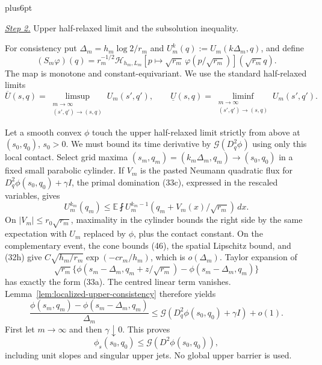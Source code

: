 \documentclass[11pt,reqno]{amsart}
\makeatletter
\theoremstyle{plain}
\theoremstyle{definition}
\theoremstyle{remark}
\renewenvironment{proof}[1][\proofname]{%
  \par
  \pushQED{\qed}%
  \normalfont
  \topsep6pt plus6pt\relax
  \trivlist
  \item[\hskip\labelsep\slshape #1\@addpunct{.}]%
  \ignorespaces
}{%
  \popQED
  \endtrivlist
  \@endpefalse
}
\DeclareRobustCommand{\qed}{%
  \leavevmode\unskip\penalty9999\hbox{}\nobreak
  \ifmmode
    \makebox[0pt][l]{\qquad\hbox{\qedsymbol}}%
  \else
    \qquad\hbox{\qedsymbol}%
  \fi
}
\renewcommand{\qedsymbol}{\rule[.47pt]{4pt}{6pt}}
\numberwithin{equation}{section}
\newcommand{\1}{\mathbf 1}
\makeatother
\begin{document}
\begin{proof}
\smallskip\noindent
\underline{\textit{Step 2.}} Upper half-relaxed limit and the subsolution inequality.

For consistency put $\Delta_m=h_m\log2/r_m$ and
$U_m^k(q):=U_m(k\Delta_m,q)$, and define
\begin{equation}
(S_ m\varphi)(q)=r_ m^{-1/2}\mathcal H_ {h_ m,L_ m}
[p\mapsto\sqrt{r_ m}\,\varphi(p/\sqrt{r_ m})](\sqrt{r_ m}q).
\tag{46b}
\end{equation}
The map is monotone and constant-equivariant.
We use the standard half-relaxed limits
\[
\overline U(s,q)=\limsup_{\substack{m\to\infty\\(s',q')\to(s,q)}}
U_m(s',q'),\qquad
\underline U(s,q)=\liminf_{\substack{m\to\infty\\(s',q')\to(s,q)}}
U_m(s',q').
\]

Let a smooth convex $\phi$ touch the upper half-relaxed limit strictly
from above at $(s_0,q_0)$, $s_0>0$.  We must bound its time derivative
by $\mathcal G(D_q^2\phi)$ using only this local contact.
Select grid maxima
$(s_ m,q_ m)=(k_ m\Delta_ m,q_ m)\to(s_ 0,q_ 0)$ in a fixed small
parabolic cylinder.  If $V_ m$ is the pasted Neumann quadratic flux for
$D_ q^2\phi(s_ 0,q_ 0)+\gamma I$, the primal domination (33c), expressed
in the rescaled variables, gives
\begin{equation}
U_ m^{k_ m}(q_ m)
\leq\mathbb E\fint
U_ m^{k_ m-1}(q_ m+V_ m(x)/\sqrt{r_ m})\,dx.
\tag{46c}
\end{equation}
On $|V_ m|\leq r_ 0\sqrt{r_ m}$, maximality in the cylinder bounds the
right side by the same expectation with $U_ m$ replaced by
$\phi$, plus the contact constant.  On the complementary event, the
cone bounds (46), the spatial Lipschitz bound, and (32h) give
$C\sqrt{h_ m/r_ m}\exp(-c r_ m/h_ m)$, which is
$o(\Delta_ m)$.  Taylor expansion of
\begin{equation*}
\sqrt{r_ m}\{\phi(s_ m-\Delta_ m,q_ m+z/\sqrt{r_ m})
-\phi(s_ m-\Delta_ m,q_ m)\}
\end{equation*}
has exactly the form (33a).  The centred linear term vanishes.  Lemma~\ref{lem:localized-upper-consistency} therefore yields
\begin{equation}
\frac{\phi(s_ m,q_ m)-\phi(s_ m-\Delta_ m,q_ m)}{\Delta_ m}
\leq \mathcal G(D_ q^2\phi(s_ 0,q_ 0)+\gamma I)+o(1).
\tag{46d}
\end{equation}
First let $m\to\infty$ and then $\gamma\downarrow0$.  This proves
\begin{equation}
\phi_ s(s_ 0,q_ 0)\leq \mathcal G(D^2\phi(s_ 0,q_ 0)),
\tag{47}
\end{equation}
including unit slopes and singular upper jets.  No global upper barrier
is used.


\end{proof}
\end{document}
